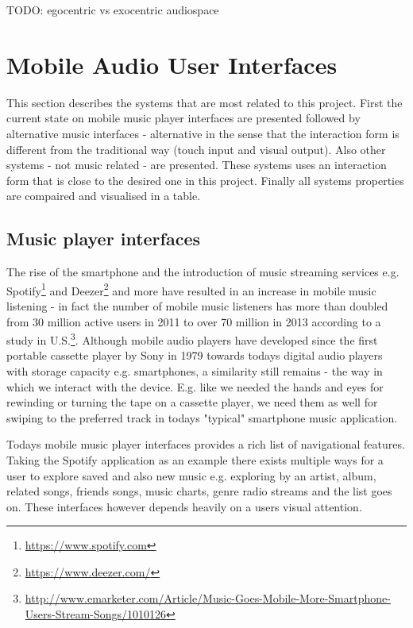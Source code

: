 TODO: egocentric vs exocentric audiospace


\section{Mobile Audio User Interfaces}
\label{sec:mobileaudiointerfaces}
This section describes the systems that are most related to this project. First the current state on mobile music player interfaces are presented followed by alternative music interfaces - alternative in the sense that the interaction form is different from the traditional way (touch input and visual output). Also other systems - not music related - are presented. These systems uses an interaction form that is close to the desired one in this project. Finally all systems properties are compaired and visualised in a table.

\subsection{Music player interfaces}
\label{sec:alternativemusicuis}
The rise of the smartphone and the introduction of music streaming services e.g. Spotify\footnote{\url{https://www.spotify.com}} and Deezer\footnote{\url{https://www.deezer.com/}} and more have resulted in an increase in mobile music listening - in fact the number of mobile music listeners has more than doubled from 30 million active users in 2011 to over 70 million in 2013 according to a study in U.S.\footnote{\url{http://www.emarketer.com/Article/Music-Goes-Mobile-More-Smartphone-Users-Stream-Songs/1010126}}. Although mobile audio players have developed since the first portable cassette player by Sony in 1979 towards todays digital audio players with storage capacity e.g. smartphones, a similarity still remains - the way in which we interact with the device. E.g. like we needed the hands and eyes for rewinding or turning the tape on a cassette player, we need them as well for swiping to the preferred track in todays "typical" smartphone music application.

Todays mobile music player interfaces provides a rich list of navigational features. Taking the Spotify application as an example there exists multiple ways for a user to explore saved and also new music e.g. exploring by an artist, album, related songs, friends songs, music charts, genre radio streams and the list goes on. These interfaces however depends heavily on a users visual attention.

